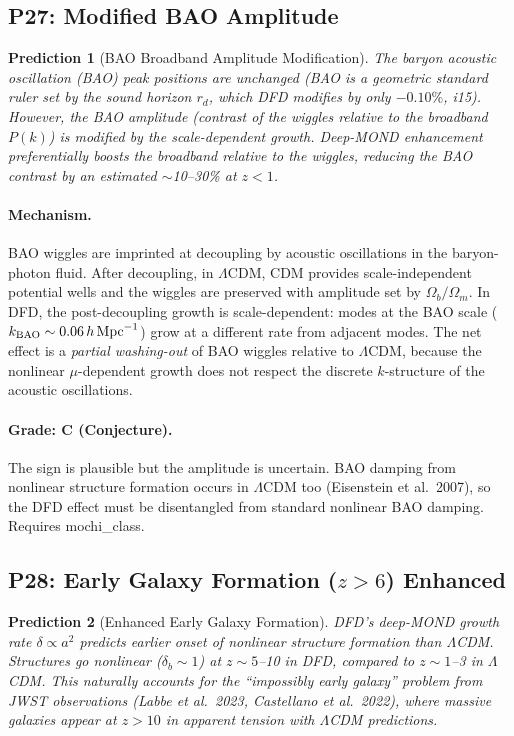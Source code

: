 \documentclass[11pt]{article}
\newcommand{\LCDM}{$\Lambda$CDM}
\newtheorem{prediction}{Prediction}
\begin{document}
\subsection{P27: Modified BAO Amplitude}

\begin{prediction}[BAO Broadband Amplitude Modification]
\label{pred:BAO}
The baryon acoustic oscillation (BAO) \emph{peak positions} are
unchanged (BAO is a geometric standard ruler set by the sound horizon
$r_d$, which DFD modifies by only $-0.10\%$, i15).  However, the
BAO \emph{amplitude} (contrast of the wiggles relative to the
broadband $P(k)$) is modified by the scale-dependent growth.  Deep-MOND
enhancement preferentially boosts the broadband relative to the wiggles,
reducing the BAO contrast by an estimated $\sim$10--30\% at $z < 1$.
\end{prediction}

\paragraph{Mechanism.}
BAO wiggles are imprinted at decoupling by acoustic oscillations in the
baryon-photon fluid.  After decoupling, in \LCDM, CDM provides
scale-independent potential wells and the wiggles are preserved with
amplitude set by $\Omega_b/\Omega_m$.  In DFD, the post-decoupling
growth is scale-dependent: modes at the BAO scale
($k_{\rm BAO} \sim 0.06\,h\,{\rm Mpc}^{-1}$) grow at a different rate
from adjacent modes.  The net effect is a \emph{partial washing-out}
of BAO wiggles relative to \LCDM, because the nonlinear $\mu$-dependent
growth does not respect the discrete $k$-structure of the acoustic
oscillations.

\paragraph{Grade: C (Conjecture).}  The sign is plausible but the
amplitude is uncertain.  BAO damping from nonlinear structure formation
occurs in \LCDM{} too (Eisenstein et al.\ 2007), so the DFD effect must
be disentangled from standard nonlinear BAO damping.  Requires
mochi\_class.


\subsection{P28: Early Galaxy Formation ($z > 6$) Enhanced}

\begin{prediction}[Enhanced Early Galaxy Formation]
\label{pred:early-gal}
DFD's deep-MOND growth rate $\delta \propto a^2$ predicts
earlier onset of nonlinear structure formation than \LCDM.
Structures go nonlinear ($\delta_b \sim 1$) at $z \sim 5$--10
in DFD, compared to $z \sim 1$--3 in \LCDM.  This naturally
accounts for the ``impossibly early galaxy'' problem from
JWST observations (Labbe et al.\ 2023, Castellano et al.\ 2022),
where massive galaxies appear at $z > 10$ in apparent tension
with \LCDM{} predictions.
\end{prediction}
\end{document}
